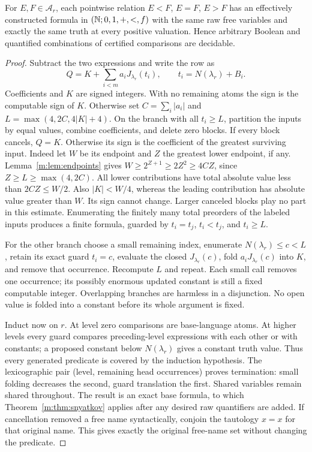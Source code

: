 \begin{theorem}\label{m:thm:common}
For $E,F\in\mathcal A_r$, each pointwise relation $E<F$, $E=F$, $E>F$
has an effectively constructed formula in $(\mathbb N;0,1,+,<,f)$ with the same
raw free variables and exactly the same truth at every positive valuation.
Hence arbitrary Boolean and quantified combinations of certified comparisons
are decidable.
\end{theorem}
\begin{proof}
Subtract the two expressions and write the row as
\[
 Q=K+\sum_{i<m}a_i J_{\lambda_r}(t_i),\qquad
 t_i=N(\lambda_r)+B_i.
\]
Coefficients and $K$ are signed integers. With no remaining atoms the sign
is the computable sign of $K$. Otherwise set
$C=\sum_i|a_i|$ and $L=\max(4,2C,4|K|+4)$.
On the branch with all $t_i\ge L$, partition the inputs by equal values,
combine coefficients, and delete zero blocks. If every block cancels,
$Q=K$. Otherwise its sign is the coefficient of the greatest surviving
input. Indeed let $W$ be its endpoint and $Z$ the greatest lower endpoint,
if any. Lemma~\ref{m:lem:endpoints} gives
$W\ge2^{Z+1}\ge2Z^2\ge4CZ$, since $Z\ge L\ge\max(4,2C)$.
All lower contributions have total absolute value less than
$2CZ\le W/2$. Also $|K|<W/4$, whereas the leading contribution has
absolute value greater than $W$. Its sign cannot change. Larger canceled
blocks play no part in this estimate. Enumerating the finitely many total
preorders of the labeled inputs produces a finite formula, guarded by
$t_i=t_j$, $t_i<t_j$, and $t_i\ge L$.

For the other branch choose a small remaining index, enumerate
$N(\lambda_r)\le c<L$, retain its exact guard $t_i=c$, evaluate the
closed $J_{\lambda_r}(c)$, fold $a_iJ_{\lambda_r}(c)$ into $K$, and
remove that occurrence. Recompute $L$ and repeat. Each small call removes
one occurrence; its possibly enormous updated constant is still a fixed
computable integer. Overlapping branches are harmless in a disjunction.
No open value is folded into a constant before its whole argument is fixed.

Induct now on $r$. At level zero comparisons are base-language atoms.
At higher levels every guard compares preceding-level expressions with
each other or with constants; a proposed constant below $N(\lambda_r)$
gives a constant truth value. Thus every generated predicate is covered
by the induction hypothesis. The lexicographic pair (level, remaining
head occurrences) proves termination: small folding decreases the second,
guard translation the first. Shared variables remain shared throughout.
The result is an exact base formula, to which
Theorem~\ref{m:thm:snyatkov} applies after any desired raw quantifiers are
added.
If cancellation removed a free name syntactically, conjoin the tautology
$x=x$ for that original name.  This gives exactly the original free-name
set without changing the predicate.
\end{proof}

